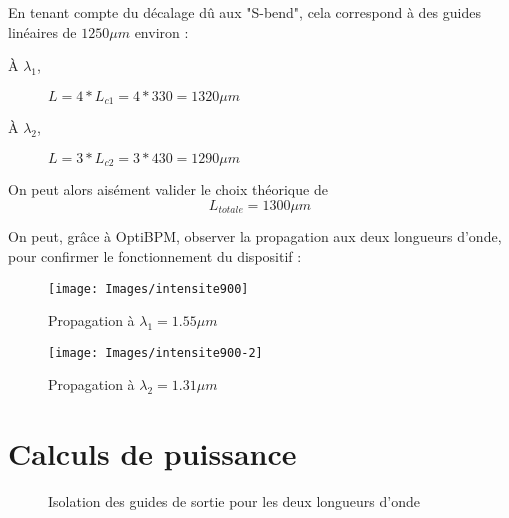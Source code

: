 \documentclass[a4paper,11pt]{report}
\begin{document}
En tenant compte du décalage dû aux "S-bend", cela correspond à des guides linéaires de $1250\mu m$ environ :
\begin{description}
    \item[À $\lambda_1$,] $L = 4*L_{c1} = 4*330 = 1320\mu m$
    \item[À $\lambda_2$,] $L = 3*L_{c2} = 3*430 = 1290\mu m$
\end{description}

On peut alors aisément valider le choix théorique de
\[L_{totale} = 1300\mu m\]
\vspace*{2mm}

On peut, grâce à OptiBPM, observer la propagation aux deux longueurs d'onde, pour confirmer le fonctionnement du dispositif : 
\begin{figure}[h]
    \begin{center}
        \texttt{[image: Images/intensite900]}
        \caption{Propagation à $\lambda_1=1.55\mu m$}
        \vspace*{1cm}
        \texttt{[image: Images/intensite900-2]}
        \caption{Propagation à $\lambda_2=1.31\mu m$}
        \label{fig:}
    \end{center}
\end{figure}

\section{Calculs de puissance}
\begin{figure}[h]
    \begin{center}
        \caption{Isolation des guides de sortie pour les deux longueurs d'onde}
        \label{big_graph}
    \end{center}
\end{figure}
\end{document}

